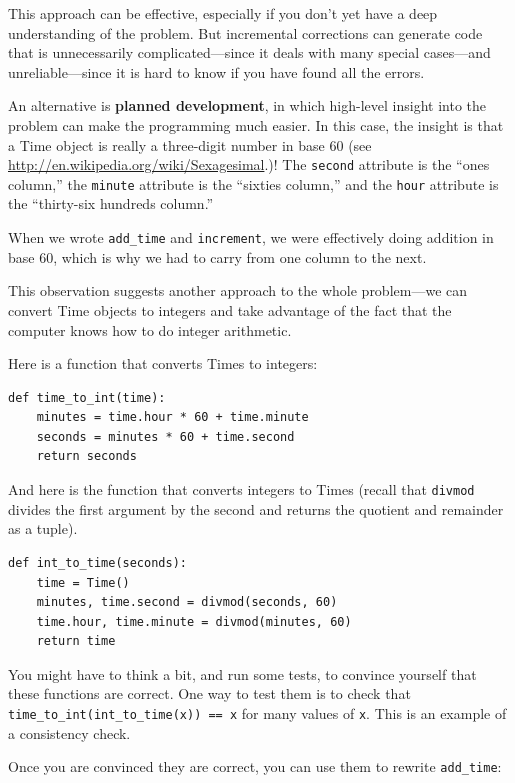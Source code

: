 \documentclass[10pt]{book}
\begin{document}
\begin{CJK}{UTF8}{gbsn}
This approach can be effective, especially if you don't yet have a
deep understanding of the problem.  But incremental corrections can
generate code that is unnecessarily complicated---since it deals with
many special cases---and unreliable---since it is hard to know if you
have found all the errors.

An alternative is {\bf planned development}, in which high-level
insight into the problem can make the programming much easier.  In
this case, the insight is that a Time object is really a three-digit
number in base 60 (see \url{http://en.wikipedia.org/wiki/Sexagesimal}.)!  The
{\tt second} attribute is the ``ones column,'' the {\tt minute}
attribute is the ``sixties column,'' and the {\tt hour} attribute is
the ``thirty-six hundreds column.''

When we wrote \verb"add_time" and {\tt increment}, we were effectively
doing addition in base 60, which is why we had to carry from one
column to the next.

This observation suggests another approach to the whole problem---we
can convert Time objects to integers and take advantage of the fact
that the computer knows how to do integer arithmetic.  

Here is a function that converts Times to integers:

\begin{verbatim}
def time_to_int(time):
    minutes = time.hour * 60 + time.minute
    seconds = minutes * 60 + time.second
    return seconds
\end{verbatim}
%
And here is the function that converts integers to Times
(recall that {\tt divmod} divides the first argument by the second
and returns the quotient and remainder as a tuple).

\begin{verbatim}
def int_to_time(seconds):
    time = Time()
    minutes, time.second = divmod(seconds, 60)
    time.hour, time.minute = divmod(minutes, 60)
    return time
\end{verbatim}
%
You might have to think a bit, and run some tests, to convince
yourself that these functions are correct.  One way to test them is to
check that \verb"time_to_int(int_to_time(x)) == x" for many values of
{\tt x}.  This is an example of a consistency check.

Once you are convinced they are correct, you can use them to 
rewrite \verb"add_time":


\end{CJK}
\end{document}
